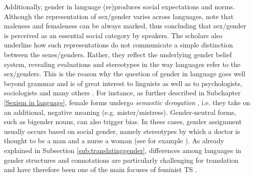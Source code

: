

Additionally, gender in language (re)produces social expectations and norms. Although the representation of sex/gender varies across languages, \textcite[164]{stahlberg2007representation} note that maleness and femaleness can be always marked, thus concluding that sex/gender is perceived as an essential social category by speakers. The scholars also underline how such representations do not communicate a simple distinction between the sexes/genders. Rather, they reflect the underlying gender belief system, revealing evaluations and stereotypes in the way languages refer to the sex/genders. This is the reason why the question of gender in language goes well beyond grammar and is of great interest to linguists as well as to psychologists, sociologists and many others \citep[163]{corbett1991gender}. For instance, as further described in Subchapter \ref{Sexism in language}, female forms undergo \textit{semantic derogation} \citep[63]{lakoff1973language}, i.e. they take on an additional, negative meaning (e.g. mister/mistress). Gender-neutral forms, such as bigender nouns, can also trigger bias. In these cases, gender assignment usually occurs based on social gender, namely stereotypes by which a doctor is thought to be a man and a nurse a woman (see for example \cite{nissen2002aspects}). As already explained in Subsection \ref{sub:translatinggender}, differences among languages in gender structures and connotations are particularly challenging for translation and have therefore been one of the main focuses of feminist TS \citep{simon1996gender,von2016translation}.


